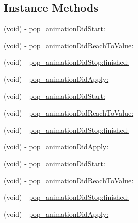 \subsection*{Instance Methods}
\begin{DoxyCompactItemize}
\item 
(void) -\/ \mbox{\hyperlink{protocol_p_o_p_animation_delegate_01-p_af4187aefc2cb3c5df86a10722872aef3}{pop\+\_\+animation\+Did\+Start\+:}}
\item 
(void) -\/ \mbox{\hyperlink{protocol_p_o_p_animation_delegate_01-p_a3c4147f706696ad9618d732439c9d0fb}{pop\+\_\+animation\+Did\+Reach\+To\+Value\+:}}
\item 
(void) -\/ \mbox{\hyperlink{protocol_p_o_p_animation_delegate_01-p_a5c84da0fa9e5baf068c950be6a494c07}{pop\+\_\+animation\+Did\+Stop\+:finished\+:}}
\item 
(void) -\/ \mbox{\hyperlink{protocol_p_o_p_animation_delegate_01-p_ae6bba4e873d7baaad2d6e27e06a5c6d4}{pop\+\_\+animation\+Did\+Apply\+:}}
\item 
(void) -\/ \mbox{\hyperlink{protocol_p_o_p_animation_delegate_01-p_af4187aefc2cb3c5df86a10722872aef3}{pop\+\_\+animation\+Did\+Start\+:}}
\item 
(void) -\/ \mbox{\hyperlink{protocol_p_o_p_animation_delegate_01-p_a3c4147f706696ad9618d732439c9d0fb}{pop\+\_\+animation\+Did\+Reach\+To\+Value\+:}}
\item 
(void) -\/ \mbox{\hyperlink{protocol_p_o_p_animation_delegate_01-p_a5c84da0fa9e5baf068c950be6a494c07}{pop\+\_\+animation\+Did\+Stop\+:finished\+:}}
\item 
(void) -\/ \mbox{\hyperlink{protocol_p_o_p_animation_delegate_01-p_ae6bba4e873d7baaad2d6e27e06a5c6d4}{pop\+\_\+animation\+Did\+Apply\+:}}
\item 
(void) -\/ \mbox{\hyperlink{protocol_p_o_p_animation_delegate_01-p_af4187aefc2cb3c5df86a10722872aef3}{pop\+\_\+animation\+Did\+Start\+:}}
\item 
(void) -\/ \mbox{\hyperlink{protocol_p_o_p_animation_delegate_01-p_a3c4147f706696ad9618d732439c9d0fb}{pop\+\_\+animation\+Did\+Reach\+To\+Value\+:}}
\item 
(void) -\/ \mbox{\hyperlink{protocol_p_o_p_animation_delegate_01-p_a5c84da0fa9e5baf068c950be6a494c07}{pop\+\_\+animation\+Did\+Stop\+:finished\+:}}
\item 
(void) -\/ \mbox{\hyperlink{protocol_p_o_p_animation_delegate_01-p_ae6bba4e873d7baaad2d6e27e06a5c6d4}{pop\+\_\+animation\+Did\+Apply\+:}}
\end{DoxyCompactItemize}


